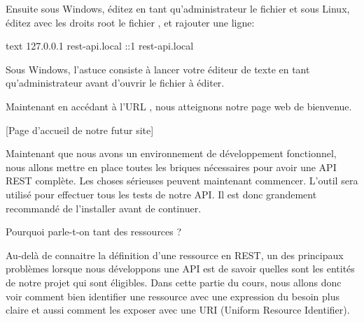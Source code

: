 \documentclass[big]{zmdocument}
\begin{document}
Ensuite sous Windows, éditez en tant qu'administrateur le fichier  et sous Linux, éditez avec les droits root le fichier , et rajouter une ligne:



\begin{CodeBlock}{text}
127.0.0.1 rest-api.local
::1 rest-api.local
\end{CodeBlock}



Sous Windows, l’astuce consiste à lancer votre éditeur de texte en tant qu'administrateur avant d'ouvrir le fichier à éditer.



Maintenant en accédant à l'URL , nous atteignons notre page web de bienvenue.



[Page d'accueil de notre futur site]


\horizontalLine



Maintenant que nous avons un environnement de développement fonctionnel, nous allons mettre en place toutes les briques nécessaires pour avoir une API REST complète. Les choses sérieuses peuvent maintenant commencer.
L'outil  sera utilisé pour effectuer tous les tests de notre API. Il est donc grandement recommandé de l'installer avant de continuer.





\begin{Question}
Pourquoi parle-t-on tant des ressources ?
\end{Question}


Au-delà de connaitre la définition d'une ressource en REST, un des principaux problèmes lorsque nous développons une API est de savoir quelles sont les entités de notre projet qui sont éligibles.
Dans cette partie du cours, nous allons donc voir comment bien identifier une ressource avec une expression du besoin plus claire et aussi comment les exposer avec une URI (Uniform Resource Identifier).



\end{document}
